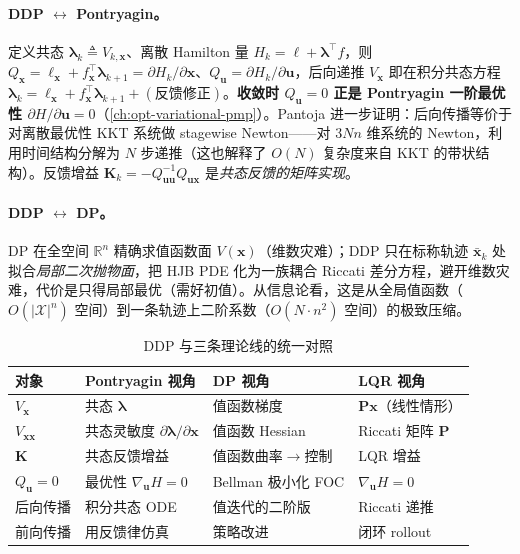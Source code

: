 \paragraph{DDP $\leftrightarrow$ Pontryagin。}\;
定义共态 $\boldsymbol{\lambda}_k\triangleq V_{k,\mathbf{x}}$、离散 Hamilton 量 $H_k=\ell+\boldsymbol{\lambda}^\top f$，则 $Q_{\mathbf{x}}=\ell_{\mathbf{x}}+f_{\mathbf{x}}^\top\boldsymbol{\lambda}_{k+1}=\partial H_k/\partial\mathbf{x}$、$Q_{\mathbf{u}}=\partial H_k/\partial\mathbf{u}$，后向递推 $V_{\mathbf{x}}$ 即在积分共态方程 $\boldsymbol{\lambda}_k=\ell_{\mathbf{x}}+f_{\mathbf{x}}^\top\boldsymbol{\lambda}_{k+1}+(\text{反馈修正})$。\textbf{收敛时 $Q_{\mathbf{u}}=0$ 正是 Pontryagin 一阶最优性 $\partial H/\partial\mathbf{u}=0$}（\cref{ch:opt-variational-pmp}）。Pantoja 进一步证明：后向传播等价于对离散最优性 KKT 系统做 stagewise Newton——对 $3Nn$ 维系统的 Newton，利用时间结构分解为 $N$ 步递推（这也解释了 $O(N)$ 复杂度来自 KKT 的带状结构）\cite{pantoja1988ddp}。反馈增益 $\mathbf{K}_k=-Q_{\mathbf{uu}}^{-1}Q_{\mathbf{ux}}$ 是\emph{共态反馈的矩阵实现}。

\paragraph{DDP $\leftrightarrow$ DP。}\;
DP 在全空间 $\mathbb{R}^n$ 精确求值函数面 $V(\mathbf{x})$（维数灾难）；DDP 只在标称轨迹 $\bar{\mathbf{x}}_k$ 处拟合\emph{局部二次抛物面}，把 HJB PDE 化为一族耦合 Riccati 差分方程，避开维数灾难，代价是只得局部最优（需好初值）。从信息论看，这是从全局值函数（$O(|\mathcal{X}|^n)$ 空间）到一条轨迹上二阶系数（$O(N\cdot n^2)$ 空间）的极致压缩。

\begin{table}[H]\centering\small
\caption{DDP 与三条理论线的统一对照}
\label{tab:ddp-unify}
\begin{tabular}{llll}
\toprule
对象 & Pontryagin 视角 & DP 视角 & LQR 视角 \\
\midrule
$V_{\mathbf{x}}$ & 共态 $\boldsymbol{\lambda}$ & 值函数梯度 & $\mathbf{P}\mathbf{x}$（线性情形）\\
$V_{\mathbf{xx}}$ & 共态灵敏度 $\partial\boldsymbol{\lambda}/\partial\mathbf{x}$ & 值函数 Hessian & Riccati 矩阵 $\mathbf{P}$ \\
$\mathbf{K}$ & 共态反馈增益 & 值函数曲率$\to$控制 & LQR 增益 \\
$Q_{\mathbf{u}}=0$ & 最优性 $\nabla_{\mathbf{u}}H=0$ & Bellman 极小化 FOC & $\nabla_{\mathbf{u}}H=0$ \\
后向传播 & 积分共态 ODE & 值迭代的二阶版 & Riccati 递推 \\
前向传播 & 用反馈律仿真 & 策略改进 & 闭环 rollout \\
\bottomrule
\end{tabular}
\end{table}

